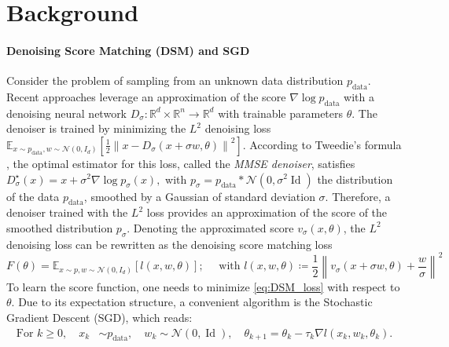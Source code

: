 \documentclass[11pt]{article}
\newcommand{\norm}[1]{\left\|{#1}\right\|}
\newcommand{\eqdef}{\coloneqq}
\newcommand{\id}{\operatorname{Id}}
\newcommand{\RR}{\mathbb{R}}
\begin{document}
\section{Background}
\label{sec:background}

\paragraph{Denoising Score Matching (DSM) and SGD}
Consider the problem of sampling from an unknown data distribution $p_\mathrm{data}$.
Recent approaches \cite{vincent2011connection, song2019generative, laumont2022bayesian} leverage an approximation of the score $\nabla \log p_\mathrm{data}$ with a denoising neural network \( D_{\sigma} : \mathbb{R}^d \times \RR^n \to \mathbb{R}^d \) with trainable parameters $\theta$.
The denoiser is trained by minimizing the $L^2$ denoising loss $\mathbb{E}_{x \sim p_\mathrm{data}, w \sim \mathcal{N}(0, I_d)} \left[ \frac12 \norm{ x - D_{ \sigma}(x + \sigma w, \theta)}^2 \right]$. According to Tweedie's formula \cite{efron2011tweedie}, the optimal estimator for this loss, called the \textit{MMSE denoiser}, satisfies $D_{\sigma}^\star(x) = x + \sigma^2 \nabla \log p_{\sigma}(x),$ with $p_{\sigma} =  p_\mathrm{data} * \mathcal{N}(0, \sigma^2 \id)$ the distribution of the data $p_\mathrm{data}$, smoothed by a Gaussian of standard deviation $\sigma$. Therefore, a denoiser trained with the $L^2$ loss provides an approximation of the score of the smoothed distribution $p_{\sigma}$. Denoting the approximated score $v_{\sigma}(x, \theta)$, the $L^2$ denoising loss can be rewritten as the denoising score matching loss 
\begin{equation}\label{eq:DSM_loss}
    F(\theta) = \mathbb{E}_{x \sim p, w \sim \mathcal{N}(0, I_d)} \left[ l(x, w, \theta) \right];\quad \text{ with }
    l(x, w, \theta) \eqdef \frac12 \norm{  v_{ \sigma}(x + \sigma w, \theta) + \frac{w}{\sigma}}^2
\end{equation}
To learn the score function, one needs to minimize \eqref{eq:DSM_loss} with respect to $\theta$. Due to its expectation structure, a convenient algorithm is the Stochastic Gradient Descent (SGD), which reads:
\begin{equation} \label{eq:basic_sgd}
\begin{split}
    \text{For $k \geq 0$}, \quad  x_k &\sim p_\mathrm{data}, \quad w_k \sim \mathcal{N}(0, \id), \quad \theta_{k+1} = \theta_k - \tau_k \nabla l(x_k, w_k, \theta_k). 
\end{split}
\end{equation}
\end{document}
